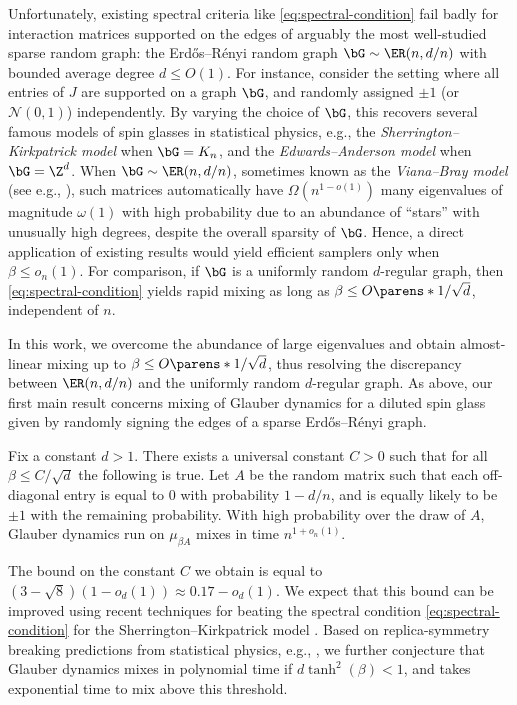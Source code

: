 \documentclass[11pt,letterpaper]{article}
\begin{document}
Unfortunately, existing spectral criteria like \cref{eq:spectral-condition} fail badly for interaction matrices supported on the edges of arguably the most well-studied sparse random graph: the Erd\H{o}s–R\'{e}nyi random graph $\bG \sim \ER(n,d/n)$ with bounded average degree $d \leq O(1)$. For instance, consider the setting where all entries of $J$ are supported on a graph $\bG$, and randomly assigned $\pm1$ (or $\mathcal{N}(0,1)$) independently. By varying the choice of $\bG$, this recovers several famous models of spin glasses in statistical physics, e.g., the \emph{Sherrington--Kirkpatrick model} when $\bG = K_{n}$, and the \emph{Edwards--Anderson model} when $\bG = \Z^{d}$. When $\bG \sim \ER(n,d/n)$, sometimes known as the \emph{Viana--Bray model} (see e.g., \cite{Mon98, MP01, MP03, GT04}), such matrices automatically have $\Omega(n^{1-o(1)})$ many eigenvalues of magnitude $\omega(1)$ with high probability due to an abundance of ``stars'' with unusually high degrees, despite the overall sparsity of $\bG$. Hence, a direct application of existing results would yield efficient samplers only when $\beta \leq o_{n}(1)$. For comparison, if $\bG$ is a uniformly random $d$-regular graph, then \cref{eq:spectral-condition} yields rapid mixing as long as $\beta \leq O\parens*{1/\sqrt{d}}$, independent of $n$.

In this work, we overcome the abundance of large eigenvalues and obtain almost-linear mixing up to $\beta \leq O\parens*{1/\sqrt{d}}$, thus resolving the discrepancy between $\ER(n,d/n)$ and the uniformly random $d$-regular graph. As above, our first main result concerns mixing of Glauber dynamics for a diluted spin glass given by randomly signing the edges of a sparse Erd\H{o}s--R\'{e}nyi graph.
\begin{theorem}
    \label{th:main}
    Fix a constant $d > 1$. There exists a universal constant $C > 0$ such that for all $\beta \leq C/\sqrt{d}$ the following is true. Let $A$ be the random matrix such that each off-diagonal entry is equal to $0$ with probability $1-d/n$, and is equally likely to be $\pm 1$ with the remaining probability. With high probability over the draw of $A$, Glauber dynamics run on $\mu_{\beta A}$ mixes in time $n^{1+o_n(1)}$.
\end{theorem}
The bound on the constant $C$ we obtain is equal to $(3-\sqrt{8}) (1-o_d(1)) \approx 0.17-o_d(1)$. We expect that this bound can be improved using recent techniques for beating the spectral condition \eqref{eq:spectral-condition} for the Sherrington--Kirkpatrick model \cite{AKV24}. Based on replica-symmetry breaking predictions from statistical physics, e.g., \cite{GT04}, we further conjecture that Glauber dynamics mixes in polynomial time if $d \tanh^2(\beta)<1$, and takes exponential time to mix above this threshold.
\end{document}
